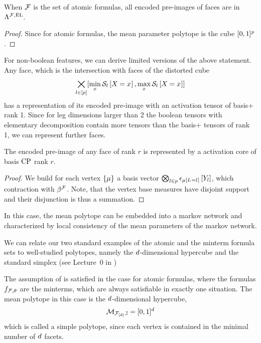 \begin{corollary}
	When $\mathcal{F}$ is the set of atomic formulas, all encoded pre-images of faces are in $\Lambda^{\mathcal{F},\mathrm{EL}}$.
\end{corollary}
\begin{proof}
	Since for atomic formulas, the mean parameter polytope is the cube $[0,1]^p$.
\end{proof}

For non-boolean features, we can derive limited versions of the above statement.
Any face, which is the intersection with faces of the distorted cube
\begin{align*}
	\bigtimes_{l\in[p]} [\min_{x}\mathcal{S}_{l}\left[X_{}=x_{}\right],\max_{x}\mathcal{S}_{l}\left[X_{}=x_{}\right]]
\end{align*}
has a representation of its encoded pre-image with an activation tensor of basis+ rank 1.
Since for leg dimensions larger than 2 the boolean tensors with elementary decomposition contain more tensors than the basis+ tensors of rank 1, we can represent further faces.



%
\begin{theorem}
	The encoded pre-image of any face of rank $r$ is represented by a activation core of basis $\mathrm{CP}$ rank $r$.
\end{theorem}
\begin{proof}
	We build for each vertex $\{\mu\}$ a basis vector $\bigotimes_{l\in p}\epsilon_{\mu\left[L_{}=l_{}\right]}\left[Y_{l}\right]$, which contraction with $\beta^{\mathcal{F}}$.
	Note, that the vertex base measures have disjoint support and their disjunction is thus a summation.
\end{proof}



In this case, the mean polytope can be embedded into a markov network and characterized by local consistency of the mean parameters of the markov network.



We can relate our two standard examples of the atomic and the minterm formula sets to well-studied polytopes, namely the $d$-dimensional hypercube and the standard simplex (see Lecture~0 in \cite{ziegler_lectures_2013} )

\begin{example}
	The assumption of  is satisfied in the case for atomic formulas, where the formulas  $f_{\mathcal{F},\theta}$ are the minterms, which are always satisfiable in exactly one situation.
	The mean polytope in this case is the $d$-dimensional hypercube,
		\[ \mathcal{M}_{\mathcal{F}_{[d]},\mathbb{I}} = [0,1]^{d} \]
	which is called a simple polytope, since each vertex is contained in the minimal number of $d$ facets.
\end{example}

